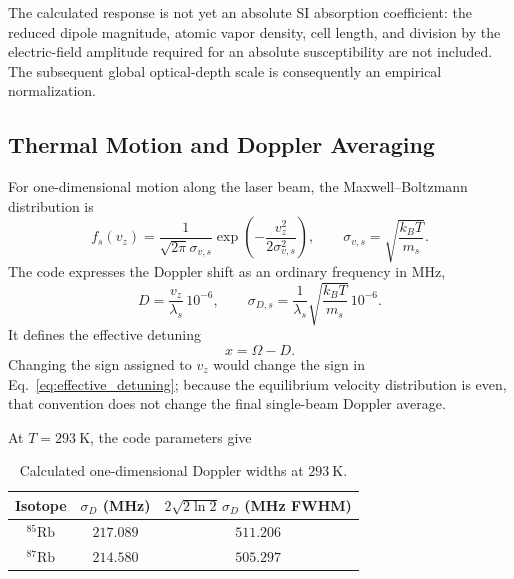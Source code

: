 The calculated response is not yet an absolute SI absorption coefficient:
the reduced dipole magnitude, atomic vapor density, cell length, and division
by the electric-field amplitude required for an absolute susceptibility are
not included.  The subsequent global optical-depth scale is consequently an
empirical normalization.

\subsection{Thermal Motion and Doppler Averaging}
\label{subsec:dm_doppler}

For one-dimensional motion along the laser beam, the Maxwell--Boltzmann
distribution is
\begin{equation}
f_s(v_z)
=
\frac{1}{\sqrt{2\pi}\sigma_{v,s}}
\exp\left(-\frac{v_z^2}{2\sigma_{v,s}^2}\right),
\qquad
\sigma_{v,s}=\sqrt{\frac{k_BT}{m_s}}.
\label{eq:maxwell_1d}
\end{equation}
The code expresses the Doppler shift as an ordinary frequency in MHz,
\begin{equation}
D=\frac{v_z}{\lambda_s}\,10^{-6},
\qquad
\sigma_{D,s}
=
\frac{1}{\lambda_s}
\sqrt{\frac{k_BT}{m_s}}\,10^{-6}.
\label{eq:doppler_sigma}
\end{equation}
It defines the effective detuning
\begin{equation}
x=\Omega-D.
\label{eq:effective_detuning}
\end{equation}
Changing the sign assigned to \(v_z\) would change the sign in
Eq.~\eqref{eq:effective_detuning}; because the equilibrium velocity
distribution is even, that convention does not change the final single-beam
Doppler average.

At \(T=293~\mathrm{K}\), the code parameters give
\begin{table}[t]
\centering
\small
\caption{Calculated one-dimensional Doppler widths at \(293~\mathrm{K}\).}
\label{tab:dm_doppler_widths}
\begin{tabular}{ccc}
\toprule
Isotope & \(\sigma_D\) (MHz) &
\(2\sqrt{2\ln2}\,\sigma_D\) (MHz FWHM) \\
\midrule
\(^{85}\mathrm{Rb}\) & \(217.089\) & \(511.206\) \\
\(^{87}\mathrm{Rb}\) & \(214.580\) & \(505.297\) \\
\bottomrule
\end{tabular}
\end{table}

